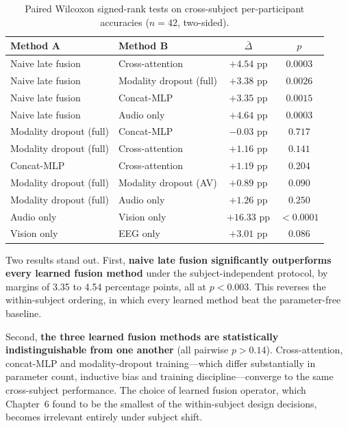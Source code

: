\begin{table}[htbp]
\centering
\caption{Paired Wilcoxon signed-rank tests on cross-subject per-participant
accuracies ($n = 42$, two-sided).}
\label{tab:cs_wilcoxon}
\begin{tabular}{llcc}
\hline
\textbf{Method A} & \textbf{Method B} & \textbf{$\bar{\Delta}$} & \textbf{$p$} \\
\hline
Naive late fusion & Cross-attention        & $+4.54$ pp & $0.0003$ \\
Naive late fusion & Modality dropout (full)& $+3.38$ pp & $0.0026$ \\
Naive late fusion & Concat-MLP             & $+3.35$ pp & $0.0015$ \\
Naive late fusion & Audio only             & $+4.64$ pp & $0.0003$ \\
\hline
Modality dropout (full) & Concat-MLP       & $-0.03$ pp & $0.717$ \\
Modality dropout (full) & Cross-attention   & $+1.16$ pp & $0.141$ \\
Concat-MLP & Cross-attention               & $+1.19$ pp & $0.204$ \\
Modality dropout (full) & Modality dropout (AV) & $+0.89$ pp & $0.090$ \\
Modality dropout (full) & Audio only       & $+1.26$ pp & $0.250$ \\
\hline
Audio only & Vision only                   & $+16.33$ pp & $<0.0001$ \\
Vision only & EEG only                     & $+3.01$ pp & $0.086$ \\
\hline
\end{tabular}
\end{table}

Two results stand out. First, \textbf{naive late fusion significantly outperforms
every learned fusion method} under the subject-independent protocol, by margins of
3.35 to 4.54 percentage points, all at $p < 0.003$. This reverses the within-subject
ordering, in which every learned method beat the parameter-free baseline.

Second, \textbf{the three learned fusion methods are statistically indistinguishable
from one another} (all pairwise $p > 0.14$). Cross-attention, concat-MLP and
modality-dropout training---which differ substantially in parameter count, inductive
bias and training discipline---converge to the same cross-subject performance. The
choice of learned fusion operator, which Chapter~6 found to be the smallest of the
within-subject design decisions, becomes irrelevant entirely under subject shift.

